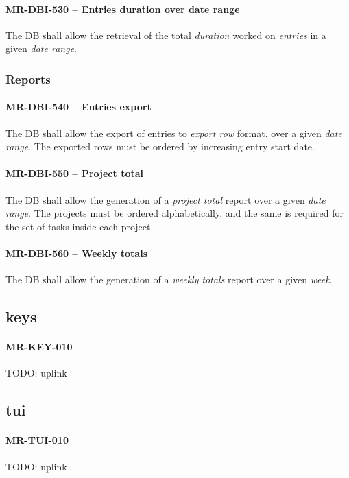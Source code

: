 \paragraph{MR-DBI-530 -- Entries duration over date range}
The \gls{DB} shall allow the retrieval of the total \emph{duration} worked
on \emph{entries} in a given \emph{date range}.

\subsubsection{Reports}
\paragraph{MR-DBI-540 -- Entries export}
The \gls{DB} shall allow the export of entries to \emph{export row} format,
over a given \emph{date range}. The exported rows must be ordered by
increasing entry start date.

\paragraph{MR-DBI-550 -- Project total}
The \gls{DB} shall allow the generation of a \emph{project total} report
over a given \emph{date range}. The projects must be ordered alphabetically,
and the same is required for the set of tasks inside each project.

\paragraph{MR-DBI-560 -- Weekly totals}
The \gls{DB} shall allow the generation of a \emph{weekly totals} report
over a given \emph{week}.

\subsection{keys}
\paragraph{MR-KEY-010}
TODO: uplink

\subsection{tui}
\paragraph{MR-TUI-010}
TODO: uplink

